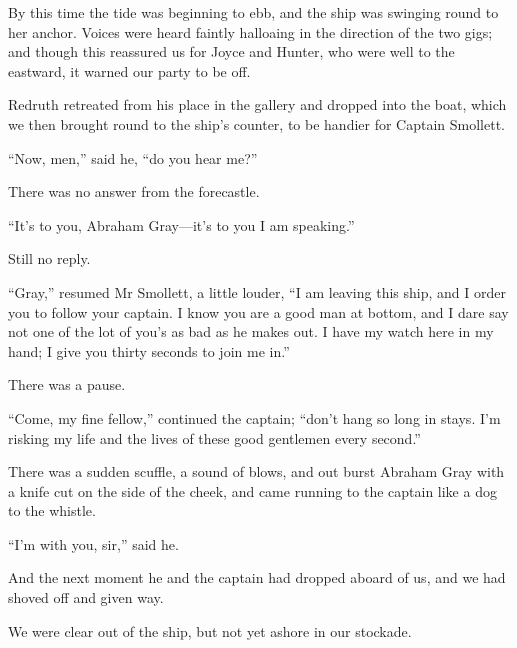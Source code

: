 By this time the tide was beginning to ebb, and the ship was swinging round to her anchor. Voices were heard faintly halloaing in the direction of the two gigs; and though this reassured us for Joyce and Hunter, who were well to the eastward, it warned our party to be off.

Redruth retreated from his place in the gallery and dropped into the boat, which we then brought round to the ship’s counter, to be handier for Captain Smollett.

\enquote{Now, men,} said he, \enquote{do you hear me?}

There was no answer from the forecastle.

\enquote{It’s to you, Abraham Gray---it’s to you I am speaking.}

Still no reply.

\enquote{Gray,} resumed Mr Smollett, a little louder, \enquote{I am leaving this ship, and I order you to follow your captain. I know you are a good man at bottom, and I dare say not one of the lot of you’s as bad as he makes out. I have my watch here in my hand; I give you thirty seconds to join me in.}

There was a pause.

\enquote{Come, my fine fellow,} continued the captain; \enquote{don’t hang so long in stays. I’m risking my life and the lives of these good gentlemen every second.}

There was a sudden scuffle, a sound of blows, and out burst Abraham Gray with a knife cut on the side of the cheek, and came running to the captain like a dog to the whistle.

\enquote{I’m with you, sir,} said he.

And the next moment he and the captain had dropped aboard of us, and we had shoved off and given way.

We were clear out of the ship, but not yet ashore in our stockade.